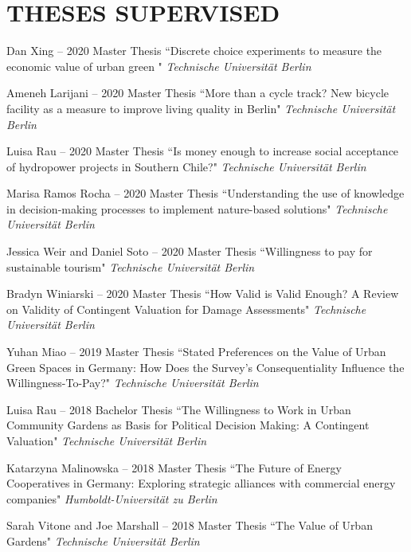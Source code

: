 \documentclass[paper=a4,fontsize=11pt]{scrartcl} %
\newcommand{\NewPart}[2]{\section*{\uppercase{#1} #2}}
\newcommand{\ThesisEntry}[5]{
		\noindent #1 -- #2 #3 ``#4" \textit{#5}}
\begin{document}
\NewPart{Theses Supervised}{}
\begin{etaremune}

\item \ThesisEntry{Dan Xing}{2020}{Master Thesis}{Discrete choice experiments to measure the economic value of urban green }{Technische Universität Berlin}

\item \ThesisEntry{Ameneh Larijani}{2020}{Master Thesis}{More than a cycle track? New bicycle facility as a measure to improve living quality in Berlin}{Technische Universität Berlin}

\item \ThesisEntry{Luisa Rau}{2020}{Master Thesis}{Is money enough to increase social acceptance of hydropower projects in Southern Chile?}{Technische Universität Berlin}

\item \ThesisEntry{Marisa Ramos Rocha}{2020}{Master Thesis}{Understanding the use of knowledge in decision-making processes to implement nature-based solutions}{Technische Universität Berlin}

\item \ThesisEntry{Jessica Weir and Daniel Soto}{2020}{Master Thesis}{Willingness to pay for sustainable tourism}{Technische Universität Berlin}

\item \ThesisEntry{Bradyn Winiarski}{2020}{Master Thesis}{How Valid is Valid Enough? A Review on Validity of Contingent Valuation for Damage Assessments}{Technische Universität Berlin}

\item \ThesisEntry{Yuhan Miao}{2019}{Master Thesis}{Stated Preferences on the Value of Urban Green Spaces in Germany: How Does the Survey's Consequentiality Influence the Willingness-To-Pay?}{Technische Universität Berlin}

\item \ThesisEntry{Luisa Rau}{2018}{Bachelor Thesis}{The Willingness to Work in Urban Community Gardens as Basis for Political Decision Making: A Contingent Valuation}{Technische Universität Berlin}

\item \ThesisEntry{Katarzyna Malinowska}{2018}{Master Thesis}{The Future of Energy Cooperatives in Germany: Exploring strategic alliances with commercial energy companies}{Humboldt-Universität zu Berlin}

\item \ThesisEntry{Sarah Vitone and Joe Marshall}{2018}{Master Thesis}{The Value of Urban Gardens}{Technische Universität Berlin}


\end{etaremune}
\end{document}
